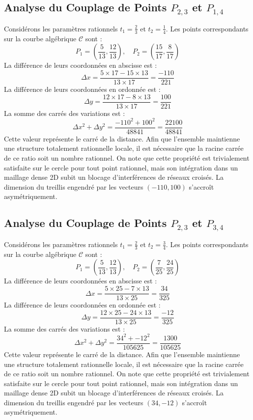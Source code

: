 \documentclass[12pt, a4paper]{article}
\begin{document}
\subsection{Analyse du Couplage de Points $P_{2,3}$ et $P_{1,4}$}
Considérons les paramètres rationnels $t_1 = \frac{2}{3}$ et $t_2 = \frac{1}{4}$.
Les points correspondants sur la courbe algébrique $\mathcal{C}$ sont :
$$ P_1 = \left( \frac{5}{13}, \frac{12}{13} \right), \quad P_2 = \left( \frac{15}{17}, \frac{8}{17} \right) $$
La différence de leurs coordonnées en abscisse est :
$$ \Delta x = \frac{5 \times 17 - 15 \times 13}{13 \times 17} = \frac{-110}{221} $$
La différence de leurs coordonnées en ordonnée est :
$$ \Delta y = \frac{12 \times 17 - 8 \times 13}{13 \times 17} = \frac{100}{221} $$
La somme des carrés des variations est :
$$ \Delta x^2 + \Delta y^2 = \frac{ -110^2 + 100^2 }{ 48841 } = \frac{ 22100 }{ 48841 } $$
Cette valeur représente le carré de la distance. Afin que l'ensemble maintienne une structure totalement rationnelle locale, il est nécessaire que la racine carrée de ce ratio soit un nombre rationnel. On note que cette propriété est trivialement satisfaite sur le cercle pour tout point rationnel, mais son intégration dans un maillage dense 2D subit un blocage d'interférences de réseaux croisés. La dimension du treillis engendré par les vecteurs $( -110, 100 )$ s'accroît asymétriquement.


\subsection{Analyse du Couplage de Points $P_{2,3}$ et $P_{3,4}$}
Considérons les paramètres rationnels $t_1 = \frac{2}{3}$ et $t_2 = \frac{3}{4}$.
Les points correspondants sur la courbe algébrique $\mathcal{C}$ sont :
$$ P_1 = \left( \frac{5}{13}, \frac{12}{13} \right), \quad P_2 = \left( \frac{7}{25}, \frac{24}{25} \right) $$
La différence de leurs coordonnées en abscisse est :
$$ \Delta x = \frac{5 \times 25 - 7 \times 13}{13 \times 25} = \frac{34}{325} $$
La différence de leurs coordonnées en ordonnée est :
$$ \Delta y = \frac{12 \times 25 - 24 \times 13}{13 \times 25} = \frac{-12}{325} $$
La somme des carrés des variations est :
$$ \Delta x^2 + \Delta y^2 = \frac{ 34^2 + -12^2 }{ 105625 } = \frac{ 1300 }{ 105625 } $$
Cette valeur représente le carré de la distance. Afin que l'ensemble maintienne une structure totalement rationnelle locale, il est nécessaire que la racine carrée de ce ratio soit un nombre rationnel. On note que cette propriété est trivialement satisfaite sur le cercle pour tout point rationnel, mais son intégration dans un maillage dense 2D subit un blocage d'interférences de réseaux croisés. La dimension du treillis engendré par les vecteurs $( 34, -12 )$ s'accroît asymétriquement.
\end{document}
